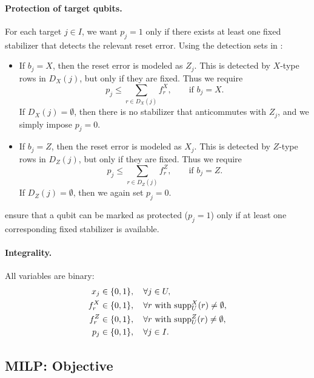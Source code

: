 \paragraph{Protection of target qubits.}
For each target $j \in I$, we want $p_j = 1$ only if there exists at least one fixed stabilizer that detects the relevant reset error. Using the detection sets in :
\begin{itemize}
  \item If $b_j = X$, then the reset error is modeled as $Z_j$. This is detected by $X$-type rows in $D_X(j)$, but only if they are fixed. Thus we require
  \begin{equation}
    p_j \le \sum_{r \in D_X(j)} f_r^X,
    \qquad \text{if } b_j = X.
    \label{eq:protect-X}
  \end{equation}
  If $D_X(j) = \emptyset$, then there is no stabilizer that anticommutes with $Z_j$, and we simply impose $p_j = 0$.
  \item If $b_j = Z$, then the reset error is modeled as $X_j$. This is detected by $Z$-type rows in $D_Z(j)$, but only if they are fixed. Thus we require
  \begin{equation}
    p_j \le \sum_{r \in D_Z(j)} f_r^Z,
    \qquad \text{if } b_j = Z.
    \label{eq:protect-Z}
  \end{equation}
  If $D_Z(j) = \emptyset$, then we again set $p_j = 0$.
\end{itemize}
 ensure that a qubit can be marked as protected ($p_j = 1$) only if at least one corresponding fixed stabilizer is available.

\paragraph{Integrality.}
All variables are binary:
\begin{equation}
\begin{aligned}
  x_j &\in \{0,1\}, \quad \forall j \in U, \\
  f_r^X &\in \{0,1\}, \quad \forall r \text{ with } \mathrm{supp}^X_U(r) \neq \emptyset, \\
  f_r^Z &\in \{0,1\}, \quad \forall r \text{ with } \mathrm{supp}^Z_U(r) \neq \emptyset, \\
  p_j &\in \{0,1\}, \quad \forall j \in I.
\end{aligned}
\label{eq:integrality}
\end{equation}

\subsection{MILP: Objective}

